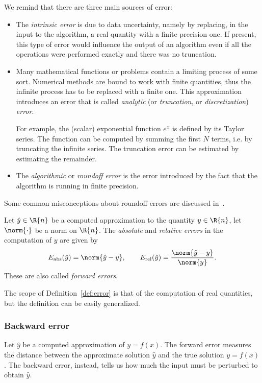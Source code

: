 We remind that there are three main sources of error:
\begin{itemize}
	\item The \emph{intrinsic error} is due to data uncertainty, namely by replacing, in the input to the algorithm, a real quantity with a finite precision one. If present, this type of error would influence the output of an algorithm even if all the operations were performed exactly and there was no truncation.
	\item Many mathematical functions or problems contain a limiting process of some sort. Numerical methods are bound to work with finite quantities, thus the infinite process has to be replaced with a finite one. This approximation introduces an error that is called \emph{analytic} (or \emph{truncation}, or \emph{discretization}) \emph{error}. 
	
	For example, the (scalar) exponential function $e^x$ is defined by its Taylor series. The function can be computed by summing the first $N$ terms, i.e. by truncating the infinite series. The truncation error can be estimated by estimating the remainder. 
	\item The \emph{algorithmic} or \emph{roundoff} \emph{error} is the error introduced by the fact that the algorithm is running in finite precision.%
\end{itemize}
Some common misconceptions about roundoff errors are discussed in~\cite[§~1.19]{higham:accuracy_book}.

\begin{definizione}\label{def:error}
	Let $\hat{y}\in\R{n}$ be a computed approximation to the quantity $y\in\R{n}$, let $\norm{\cdot}$ be a norm on $\R{n}$. The \emph{absolute} and \emph{relative} \emph{errors} in the computation of $y$ are given by
	\[
		E_{\textup{abs}}(\hat{y}) = \norm{\hat{y}-y}, \qquad E_{\textup{rel}}(\hat{y}) = \frac{\norm{\hat{y}-y}}{\norm{y}}.
	\]
	These are also called \emph{forward errors}.
\end{definizione}
The scope of Definition~\ref{def:error} is that of the computation of real quantities, but the definition can be easily generalized.

\subsubsection*{Backward error}
Let $\hat{y}$ be a computed approximation of $y=f(x)$.
The forward error measures the distance between the approximate solution $\hat{y}$ and the true solution $y=f(x)$. The backward error, instead, tells us how much the input must be perturbed to obtain $\hat{y}$.

